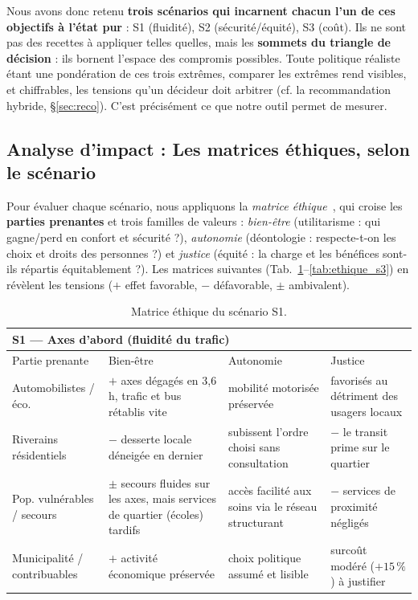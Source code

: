 \documentclass[11pt,a4paper]{article}
\begin{document}
Nous avons donc retenu \textbf{trois scénarios qui incarnent chacun l'un de ces
objectifs à l'état pur} : S1 (fluidité), S2 (sécurité/équité), S3 (coût). Ils ne
sont pas des recettes à appliquer telles quelles, mais les \textbf{sommets du
triangle de décision} : ils bornent l'espace des compromis possibles. Toute
politique réaliste étant une pondération de ces trois extrêmes, comparer les
extrêmes rend visibles, et chiffrables, les tensions qu'un décideur doit
arbitrer (cf. la recommandation hybride, §\ref{sec:reco}). C'est précisément ce
que notre outil permet de mesurer.

\subsection{Analyse d'impact : Les matrices éthiques, selon le scénario}
Pour évaluer chaque scénario, nous appliquons la \emph{matrice
éthique}~\cite{mepham2006}, qui croise les \textbf{parties prenantes} et trois
familles de valeurs : \emph{bien-être} (utilitarisme : qui gagne/perd en
confort et sécurité ?), \emph{autonomie} (déontologie : respecte-t-on les
choix et droits des personnes ?) et \emph{justice} (équité : la charge et les
bénéfices sont-ils répartis équitablement ?). Les matrices suivantes
(Tab.~\ref{tab:ethique_s1}–\ref{tab:ethique_s3}) en révèlent les tensions ($+$ effet favorable, $-$ défavorable, $\pm$ ambivalent).

\begin{table}[H]
\centering\small
\renewcommand{\arraystretch}{1.2}
\begin{tabular}{p{2.6cm}p{4.0cm}p{3.7cm}p{3.8cm}}
\toprule
\multicolumn{4}{l}{\textbf{S1 — Axes d'abord} (fluidité du trafic)}\\
\midrule
Partie prenante & Bien-être & Autonomie & Justice\\
\midrule
Automobilistes / éco. & \textbf{$+$} axes dégagés en 3,6 h, trafic et bus rétablis vite & mobilité motorisée préservée & favorisés au détriment des usagers locaux\\
Riverains résidentiels & \textbf{$-$} desserte locale déneigée en dernier & subissent l'ordre choisi sans consultation & \textbf{$-$} le transit prime sur le quartier\\
Pop. vulnérables / secours & \textbf{$\pm$} secours fluides sur les axes, mais services de quartier (écoles) tardifs & accès facilité aux soins via le réseau structurant & \textbf{$-$} services de proximité négligés\\
Municipalité / contribuables & \textbf{$+$} activité économique préservée & choix politique assumé et lisible & surcoût modéré ($+15\,\%$) à justifier\\
\bottomrule
\end{tabular}
\caption{Matrice éthique du scénario S1.}
\label{tab:ethique_s1}
\end{table}
\end{document}
